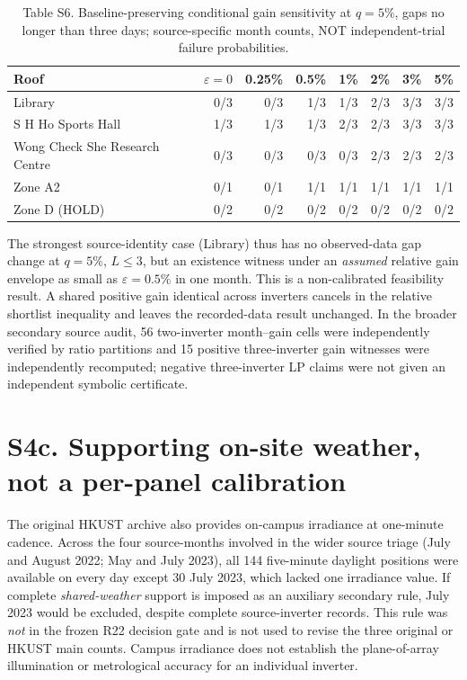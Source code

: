\documentclass[11pt]{article}
\begin{document}
\begin{table}[h]
\centering
\caption*{Table S6. Baseline-preserving conditional gain sensitivity at $q=5\%$, gaps no longer than three days; source-specific month counts, NOT independent-trial failure probabilities.}
\small
\begin{tabular}{p{3.8cm}rrrrrrr}
\toprule
Roof & $\varepsilon=0$ & 0.25\% & 0.5\% & 1\% & 2\% & 3\% & 5\% \\
\midrule
Library & 0/3 & 0/3 & 1/3 & 1/3 & 2/3 & 3/3 & 3/3 \\
S H Ho Sports Hall & 1/3 & 1/3 & 1/3 & 2/3 & 2/3 & 3/3 & 3/3 \\
Wong Check She Research Centre & 0/3 & 0/3 & 0/3 & 0/3 & 2/3 & 2/3 & 2/3 \\
Zone A2 & 0/1 & 0/1 & 1/1 & 1/1 & 1/1 & 1/1 & 1/1 \\
Zone D (HOLD) & 0/2 & 0/2 & 0/2 & 0/2 & 0/2 & 0/2 & 0/2 \\
\bottomrule
\end{tabular}
\end{table}

The strongest source-identity case (Library) thus has no observed-data gap change at $q=5\%$, $L\leq3$, but an existence witness under an \emph{assumed} relative gain envelope as small as $\varepsilon=0.5\%$ in one month. This is a non-calibrated feasibility result. A shared positive gain identical across inverters cancels in the relative shortlist inequality and leaves the recorded-data result unchanged. In the broader secondary source audit, 56 two-inverter month--gain cells were independently verified by ratio partitions and 15 positive three-inverter gain witnesses were independently recomputed; negative three-inverter LP claims were not given an independent symbolic certificate.

\section*{S4c. Supporting on-site weather, not a per-panel calibration}
The original HKUST archive also provides on-campus irradiance at one-minute cadence. Across the four source-months involved in the wider source triage (July and August 2022; May and July 2023), all 144 five-minute daylight positions were available on every day except 30 July 2023, which lacked one irradiance value. If complete \emph{shared-weather} support is imposed as an auxiliary secondary rule, July 2023 would be excluded, despite complete source-inverter records. This rule was \emph{not} in the frozen R22 decision gate and is not used to revise the three original or HKUST main counts. Campus irradiance does not establish the plane-of-array illumination or metrological accuracy for an individual inverter.
\end{document}
